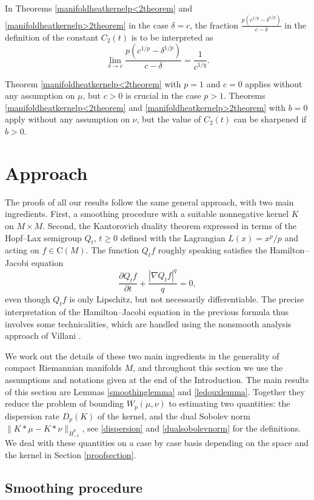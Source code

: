 \documentclass[11pt,a4paper]{article}
\theoremstyle{definition}
\begin{document}
\noindent In Theorems \ref{manifoldheatkernelp<2theorem} and \ref{manifoldheatkernelp>2theorem} in the case $\delta=c$, the fraction $\frac{p(c^{1/p} - \delta^{1/p})}{c-\delta}$ in the definition of the constant $C_2(t)$ is to be interpreted as
\[ \lim_{\delta \to c} \frac{p(c^{1/p}-\delta^{1/p})}{c-\delta} = \frac{1}{c^{1/q}} . \]

Theorem \ref{manifoldheatkernelp<2theorem} with $p=1$ and $c=0$ applies without any assumption on $\mu$, but $c>0$ is crucial in the case $p>1$. Theorems \ref{manifoldheatkernelp<2theorem} and \ref{manifoldheatkernelp>2theorem} with $b=0$ apply without any assumption on $\nu$, but the value of $C_2(t)$ can be sharpened if $b>0$.

\section{Approach}\label{approachsection}

The proofs of all our results follow the same general approach, with two main ingredients. First, a smoothing procedure with a suitable nonnegative kernel $K$ on $M \times M$. Second, the Kantorovich duality theorem expressed in terms of the Hopf--Lax semigroup $Q_t$, $t \ge 0$ defined with the Lagrangian $L(x)=x^p/p$ and acting on $f \in \mathrm{C}(M)$. The function $Q_t f$ roughly speaking satisfies the Hamilton--Jacobi equation
\[ \frac{\partial Q_t f}{\partial t} + \frac{|\nabla Q_t f|^q}{q} = 0, \]
even though $Q_t f$ is only Lipschitz, but not necessarily differentiable. The precise interpretation of the Hamilton--Jacobi equation in the previous formula thus involves some technicalities, which are handled using the nonsmooth analysis approach of Villani \cite{VI}.

We work out the details of these two main ingredients in the generality of compact Riemannian manifolds $M$, and throughout this section we use the assumptions and notations given at the end of the Introduction. The main results of this section are Lemmas \ref{smoothinglemma} and \ref{ledouxlemma}. Together they reduce the problem of bounding $W_p (\mu, \nu)$ to estimating two quantities: the dispersion rate $D_p (K)$ of the kernel, and the dual Sobolev norm $\| K*\mu - K*\nu \|_{\dot{H}_{-1}^p}$, see \eqref{dispersion} and \eqref{dualsobolevnorm} for the definitions. We deal with these quantities on a case by case basis depending on the space and the kernel in Section \ref{proofsection}.

\subsection{Smoothing procedure}
\end{document}

